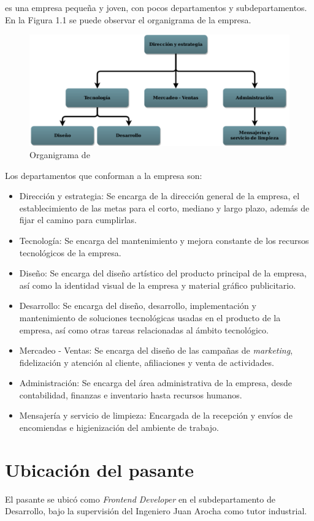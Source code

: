 \business es una empresa pequeña y joven, con pocos departamentos y subdepartamentos. En la Figura 1.1 se puede observar el organigrama de la empresa.

\begin{figure}
  \includegraphics[width=\linewidth]{figures/organization.png}
  \caption{Organigrama de \business}
  \label{fig:boat1}
\end{figure}

Los departamentos que conforman a la empresa son:

\begin{itemize}
  \item Dirección y estrategia: Se encarga de la dirección general de la empresa, el establecimiento de las metas para el corto, mediano y largo plazo, además de fijar el camino para cumplirlas.
  \item Tecnología: Se encarga del mantenimiento y mejora constante de los recursos tecnológicos de la empresa.
  \item Diseño: Se encarga del diseño artístico del producto principal de la empresa, así como la identidad visual de la empresa y material gráfico publicitario.
  \item Desarrollo: Se encarga del diseño, desarrollo, implementación y mantenimiento de soluciones tecnológicas usadas en el producto de la empresa, así como otras tareas relacionadas al ámbito tecnológico.
  \item Mercadeo - Ventas: Se encarga del diseño de las campañas de \textit{marketing}, fidelización y atención al cliente, afiliaciones y venta de actividades.
  \item Administración: Se encarga del área administrativa de la empresa, desde contabilidad, finanzas e inventario hasta recursos humanos.
  \item Mensajería y servicio de limpieza: Encargada de la recepción y envíos de encomiendas e higienización del ambiente de trabajo.
\end{itemize}

\section{Ubicación del pasante}

El pasante se ubicó como \textit{Frontend Developer} en el subdepartamento de Desarrollo, bajo la supervisión del Ingeniero Juan Arocha como tutor industrial.
